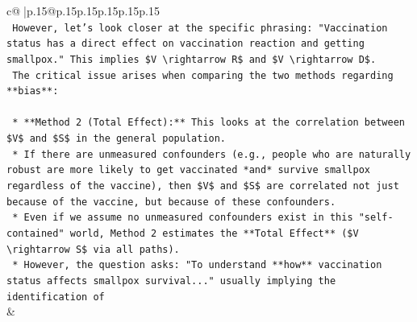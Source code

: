 \documentclass{article}
\begin{document}
{\begin{supertabular}{c@{$\;$}|p{.15\linewidth}@{}p{.15\linewidth}p{.15\linewidth}p{.15\linewidth}p{.15\linewidth}p{.15\linewidth}}
{{{\\ 
\texttt{    However, let's look closer at the specific phrasing: "Vaccination status has a direct effect on vaccination reaction and getting smallpox." This implies \$V \textbackslash{}rightarrow R\$ and \$V \textbackslash{}rightarrow D\$.} \\
\texttt{    The critical issue arises when comparing the two methods regarding **bias**:} \\
\\ 
\texttt{    *   **Method 2 (Total Effect):** This looks at the correlation between \$V\$ and \$S\$ in the general population.} \\
\texttt{        *   If there are unmeasured confounders (e.g., people who are naturally robust are more likely to get vaccinated *and* survive smallpox regardless of the vaccine), then \$V\$ and \$S\$ are correlated not just because of the vaccine, but because of these confounders.} \\
\texttt{        *   Even if we assume no unmeasured confounders exist in this "self{-}contained" world, Method 2 estimates the **Total Effect** (\$V \textbackslash{}rightarrow S\$ via all paths).} \\
\texttt{        *   However, the question asks: "To understand **how** vaccination status affects smallpox survival..." usually implying the identification of} \\
            }
        }
    }
    & \\ \\


\end{supertabular}}
\end{document}
